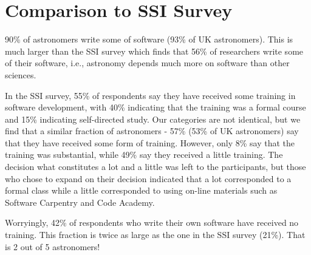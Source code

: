 \section{Comparison to SSI Survey}

90\% of astronomers write some of software (93\% of UK astronomers). This is much larger than the SSI survey which finds that 56\% of researchers write some of their software, i.e., astronomy depends much more on software than other sciences.

In the SSI survey, 55\% of respondents say they have received some training in software development, with 40\% indicating that the training was a formal course and 15\% indicating self-directed study. Our categories are not identical, but we find that a similar fraction of astronomers - 57\% (53\% of UK astronomers) say that they have received some form of training. However, only 8\% say that the training was substantial, while 49\% say they received a little training. The decision what constitutes a lot and a little was left to the participants, but those who chose to expand on their decision indicated that a lot corresponded to a formal class while a little corresponded to using on-line materials such as Software Carpentry and Code Academy.

Worryingly, 42\% of respondents who write their own software have received no training. This fraction is twice as large as the one in the SSI survey (21\%). That is 2 out of 5 astronomers! 

